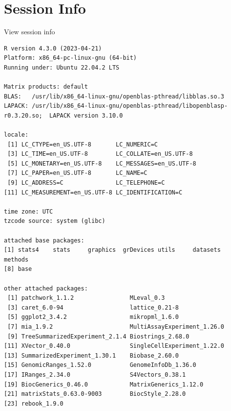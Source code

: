 \documentclass[
]{book}
\begin{document}
\hypertarget{session-info-8}{%
\section*{Session Info}\label{session-info-8}}

View session info

\begin{verbatim}
R version 4.3.0 (2023-04-21)
Platform: x86_64-pc-linux-gnu (64-bit)
Running under: Ubuntu 22.04.2 LTS

Matrix products: default
BLAS:   /usr/lib/x86_64-linux-gnu/openblas-pthread/libblas.so.3 
LAPACK: /usr/lib/x86_64-linux-gnu/openblas-pthread/libopenblasp-r0.3.20.so;  LAPACK version 3.10.0

locale:
 [1] LC_CTYPE=en_US.UTF-8       LC_NUMERIC=C              
 [3] LC_TIME=en_US.UTF-8        LC_COLLATE=en_US.UTF-8    
 [5] LC_MONETARY=en_US.UTF-8    LC_MESSAGES=en_US.UTF-8   
 [7] LC_PAPER=en_US.UTF-8       LC_NAME=C                 
 [9] LC_ADDRESS=C               LC_TELEPHONE=C            
[11] LC_MEASUREMENT=en_US.UTF-8 LC_IDENTIFICATION=C       

time zone: UTC
tzcode source: system (glibc)

attached base packages:
[1] stats4    stats     graphics  grDevices utils     datasets  methods  
[8] base     

other attached packages:
 [1] patchwork_1.1.2                MLeval_0.3                    
 [3] caret_6.0-94                   lattice_0.21-8                
 [5] ggplot2_3.4.2                  mikropml_1.6.0                
 [7] mia_1.9.2                      MultiAssayExperiment_1.26.0   
 [9] TreeSummarizedExperiment_2.1.4 Biostrings_2.68.0             
[11] XVector_0.40.0                 SingleCellExperiment_1.22.0   
[13] SummarizedExperiment_1.30.1    Biobase_2.60.0                
[15] GenomicRanges_1.52.0           GenomeInfoDb_1.36.0           
[17] IRanges_2.34.0                 S4Vectors_0.38.1              
[19] BiocGenerics_0.46.0            MatrixGenerics_1.12.0         
[21] matrixStats_0.63.0-9003        BiocStyle_2.28.0              
[23] rebook_1.9.0                  


\end{verbatim}
\end{document}
